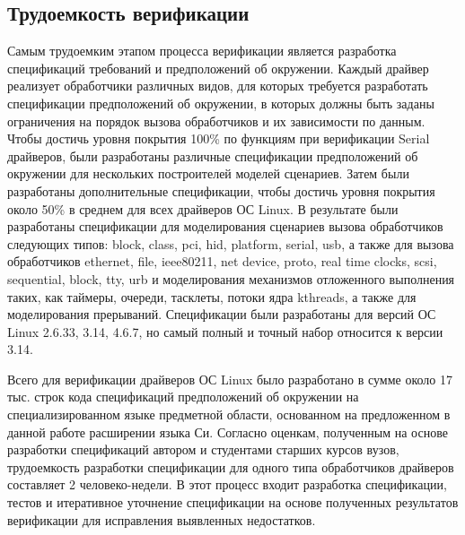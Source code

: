 \subsection{Трудоемкость верификации}
Самым трудоемким этапом процесса верификации является разработка спецификаций требований и предположений об окружении.
Каждый драйвер реализует обработчики различных видов, для которых требуется разработать спецификации предположений об окружении, в которых должны быть заданы ограничения на порядок вызова обработчиков и их зависимости по данным.
Чтобы достичь уровня покрытия 100\% по функциям при верификации Serial драйверов, были разработаны различные спецификации предположений об окружении для нескольких построителей моделей сценариев.
Затем были разработаны дополнительные спецификации, чтобы достичь уровня покрытия около 50\% в среднем для всех драйверов ОС Linux.
В результате были разработаны спецификации для моделирования сценариев вызова обработчиков следующих типов: block, class, pci, hid, platform, serial, usb, а также для вызова обработчиков ethernet, file, ieee80211, net device, proto, real time clocks, scsi, sequential, block, tty, urb и моделирования механизмов отложенного выполнения таких, как таймеры, очереди, тасклеты, потоки ядра kthreads, а также для моделирования прерываний.
Спецификации были разработаны для версий ОС Linux 2.6.33, 3.14, 4.6.7, но самый полный и точный набор относится к версии 3.14.

Всего для верификации драйверов ОС Linux было разработано в сумме около 17 тыс. строк кода спецификаций предположений об окружении на специализированном языке предметной области, основанном на предложенном в данной работе расширении языка Си.
Согласно оценкам, полученным на основе разработки спецификаций автором и студентами старших курсов вузов, трудоемкость разработки спецификации для одного типа обработчиков драйверов составляет 2 человеко-недели.
В этот процесс входит разработка спецификации, тестов и итеративное уточнение спецификации на основе полученных результатов верификации для исправления выявленных недостатков.

